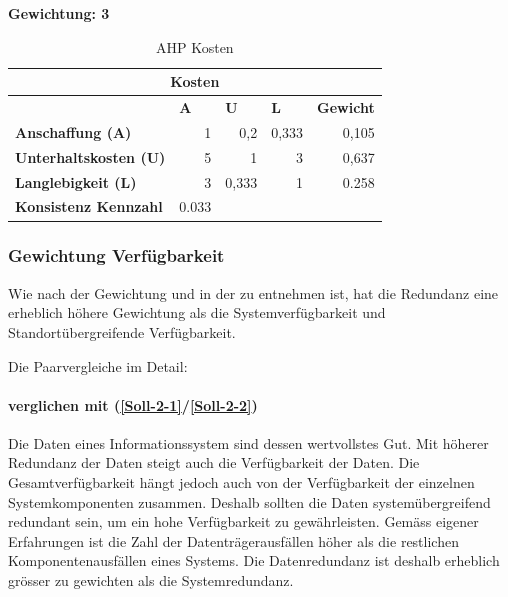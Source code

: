 \textbf{Gewichtung: 3}

\begin{table}[htbp]
\caption{AHP Kosten}
\begin{tabular}{|l|r|l|l|l|}
\hline
\multicolumn{ 5}{|c|}{\textbf{Kosten}} \\ \hline
 & \multicolumn{1}{l|}{\textbf{A}} & \textbf{U} & \textbf{L} & \textbf{Gewicht} \\ \hline
\textbf{Anschaffung (A)} & 1 & \multicolumn{1}{r|}{0,2} & \multicolumn{1}{r|}{0,333} & \multicolumn{1}{r|}{0,105} \\ \hline
\textbf{Unterhaltskosten (U)} & 5 & \multicolumn{1}{r|}{1} & \multicolumn{1}{r|}{3} & \multicolumn{1}{r|}{0,637} \\ \hline
\textbf{Langlebigkeit (L)} & 3 & \multicolumn{1}{r|}{0,333} & \multicolumn{1}{r|}{1} & \multicolumn{1}{r|}{0.258} \\ \hline
\textbf{Konsistenz Kennzahl} & 0.033 \\ \cline{1-2}
\end{tabular}
\label{tab:AHPKosten}
\end{table}

\subsubsection*{Gewichtung Verfügbarkeit}

Wie nach der Gewichtung und in der  zu entnehmen ist, hat die Redundanz eine erheblich höhere Gewichtung als die Systemverfügbarkeit und Standortübergreifende Verfügbarkeit.

Die Paarvergleiche im Detail:

\paragraph*{ verglichen mit  (\ref{Soll-2-1}/\ref{Soll-2-2})}
Die Daten eines Informationssystem sind dessen wertvollstes Gut. Mit höherer Redundanz der Daten steigt auch die Verfügbarkeit der Daten.
Die Gesamtverfügbarkeit hängt jedoch auch von der Verfügbarkeit der einzelnen Systemkomponenten zusammen. Deshalb sollten die Daten systemübergreifend redundant sein, um ein hohe Verfügbarkeit zu gewährleisten. Gemäss eigener Erfahrungen ist die Zahl der Datenträgerausfällen höher als die restlichen Komponentenausfällen eines Systems. Die Datenredundanz ist deshalb erheblich grösser zu gewichten als die Systemredundanz.

